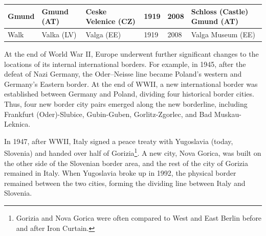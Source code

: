 \documentclass[12pt]{article}    %
\begin{document}
\begin{table}[H]
{{\begin{tabular}{|l|l|l|l|l|l|}
         \hline
Gmund                    & Gmund (AT)                                                      & Ceske Velenice (CZ)                & 1919             &  {2008}          & Schloss (Castle) Gmund (AT)\\
 
   \hline
 Walk                     & Valka (LV)                                                       & Valga (EE)                         & 1919             & {2008}        & Valga Museum (EE)
 \\
\hline
 \end{tabular} 

 }
    }
\end{table}




\par At the end of World War II, Europe underwent further significant changes to  the locations of its internal international borders. For example, in 1945, after the defeat of Nazi Germany, the Oder–Neisse line became Poland’s western and Germany’s Eastern border. At the end of WWII, a new international border was established between Germany and Poland, dividing four historical border cities. Thus, four new border city pairs emerged along the new borderline, including Frankfurt (Oder)-Slubice, Gubin-Guben, Gorlitz-Zgorlec, and Bad Muskau-Leknica. 


\par In 1947, after WWII, Italy signed a peace treaty with Yugoslavia (today, Slovenia) and handed over half of Gorizia\footnote{Gorizia and Nova Gorica were often compared to West and East Berlin before and after Iron Curtain.}. A new city, Nova Gorica, was built on the other side of the Slovenian border area, and the rest of the city of Gorizia remained in Italy. When Yugoslavia broke up in 1992, the physical border remained between the two cities, forming the dividing line between Italy and Slovenia. 
\end{document}
